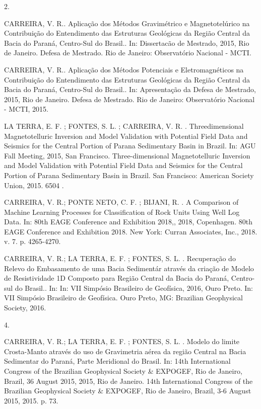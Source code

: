 \documentclass[10pt]{article}
\begin{document}
2.

CARREIRA, V. R.. Aplicação dos Métodos Gravimétrico e Magnetotelúrico na Contribuição do Entendimento das Estruturas Geológicas da Região Central da Bacia do Paraná, Centro-Sul do Brasil.. In: Dissertacão de Mestrado, 2015, Rio de Janeiro. Defesa de Mestrado. Rio de Janeiro: Observatório Nacional - MCTI.

CARREIRA, V. R.. Aplicação dos Métodos Potenciais e Eletromagnéticos na Contribuição do Entendimento das Estruturas Geológicas da Região Central da Bacia do Paraná, Centro-Sul do Brasil.. In: Apresentação da Defesa de Mestrado, 2015, Rio de Janeiro. Defesa de Mestrado. Rio de Janeiro: Observatório Nacional - MCTI, 2015.

LA TERRA, E. F. ; FONTES, S. L. ; CARREIRA, V. R. . Threedimensional Magnetotelluric Inversion and Model Validation with Potential Field Data and Seismics for the Central Portion of Parana Sedimentary Basin in Brazil. In: AGU Fall Meeting, 2015, San Francisco. Three-dimensional Magnetotelluric Inversion and Model Validation with Potential Field Data and Seismics for the Central Portion of Parana Sedimentary Basin in Brazil. San Francisco: American Society Union, 2015. 6504 .

CARREIRA, V. R.; PONTE NETO, C. F. ; BIJANI, R. . A Comparison of Machine Learning Processes for Classification of Rock Units Using Well Log Data. In: 80th EAGE Conference and Exhibition 2018,, 2018, Copenhagen. 80th EAGE Conference and Exhibition 2018. New York: Curran Associates, Inc., 2018. v. 7. p. 4265-4270.

CARREIRA, V. R.; LA TERRA, E. F. ; FONTES, S. L. . Recuperação do Relevo do Embasamento de uma Bacia Sedimentár através da criação de Modelo de Resistividade 1D Composto para Região Central da Bacia do Paraná, Centro-sul do Brasil.. In: In: VII Simpósio Brasileiro de Geofísica, 2016, Ouro Preto. In: VII Simpósio Brasileiro de Geofísica. Ouro Preto, MG: Brazilian Geophysical Society, 2016.

4.

CARREIRA, V. R.; LA TERRA, E. F. ; FONTES, S. L. . Modelo do limite Crosta-Manto através do uso de Gravimetria aérea da região Central na Bacia Sedimentar do Paraná, Parte Meridional do Brasil. In: 14th International Congress of the Brazilian Geophysical Society \& EXPOGEF, Rio de Janeiro, Brazil, 36 August 2015, 2015, Rio de Janeiro. 14th International Congress of the Brazilian Geophysical Society \& EXPOGEF, Rio de Janeiro, Brazil, 3-6 August 2015, 2015. p. 73.
\end{document}
